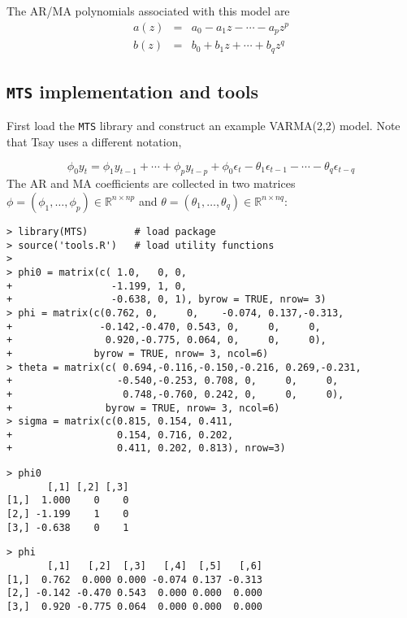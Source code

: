 \documentclass[]{article}
\begin{document}
The AR/MA polynomials associated with this model are \[
\begin{array}{rcl}
a(z) &=& a_0 - a_1z-\cdots - a_pz^p\\
b(z) &=& b_0 + b_1z + \cdots + b_qz^q
\end{array}
\]

\subsection{\texorpdfstring{\texttt{MTS} implementation and
tools}{MTS implementation and tools}}\label{mts-implementation-and-tools}

First load the \texttt{MTS} library and construct an example VARMA(2,2)
model. Note that Tsay uses a different notation,

\[
\phi_0 y_t = \phi_1 y_{t-1} + \cdots + \phi_p y_{t-p} + 
          \phi_0 \epsilon_t - \theta_1 \epsilon_{t-1} - \cdots - \theta_q \epsilon_{t-q}
\] The AR and MA coefficients are collected in two matrices
\(\phi=(\phi_1,\ldots,\phi_p)\in\mathbb{R}^{n\times np}\) and
\(\theta=(\theta_1,\ldots,\theta_q)\in\mathbb{R}^{n\times nq}\):

\begin{verbatim}
> library(MTS)        # load package 
> source('tools.R')   # load utility functions
> 
> phi0 = matrix(c( 1.0,   0, 0, 
+                 -1.199, 1, 0, 
+                 -0.638, 0, 1), byrow = TRUE, nrow= 3)
> phi = matrix(c(0.762, 0,     0,    -0.074, 0.137,-0.313,
+               -0.142,-0.470, 0.543, 0,     0,     0, 
+                0.920,-0.775, 0.064, 0,     0,     0), 
+              byrow = TRUE, nrow= 3, ncol=6)
> theta = matrix(c( 0.694,-0.116,-0.150,-0.216, 0.269,-0.231,
+                  -0.540,-0.253, 0.708, 0,     0,     0,
+                   0.748,-0.760, 0.242, 0,     0,     0), 
+                byrow = TRUE, nrow= 3, ncol=6)
> sigma = matrix(c(0.815, 0.154, 0.411, 
+                  0.154, 0.716, 0.202, 
+                  0.411, 0.202, 0.813), nrow=3)
\end{verbatim}

\begin{verbatim}
> phi0
       [,1] [,2] [,3]
[1,]  1.000    0    0
[2,] -1.199    1    0
[3,] -0.638    0    1
\end{verbatim}

\begin{verbatim}
> phi
       [,1]   [,2]  [,3]   [,4]  [,5]   [,6]
[1,]  0.762  0.000 0.000 -0.074 0.137 -0.313
[2,] -0.142 -0.470 0.543  0.000 0.000  0.000
[3,]  0.920 -0.775 0.064  0.000 0.000  0.000
\end{verbatim}
\end{document}
